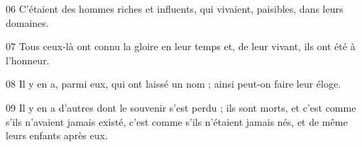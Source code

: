 
06 C’étaient des hommes riches et influents, qui vivaient, paisibles, dans leurs domaines.

07 Tous ceux-là ont connu la gloire en leur temps et, de leur vivant, ils ont été à l’honneur.

08 Il y en a, parmi eux, qui ont laissé un nom ; ainsi peut-on faire leur éloge.

09 Il y en a d’autres dont le souvenir s’est perdu ; ils sont morts, et c’est comme s’ils n’avaient jamais existé, c’est comme s’ils n’étaient jamais nés, et de même leurs enfants après eux.
